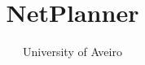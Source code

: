 \documentclass[12pt, a4paper]{article}
\begin{document}
\title{NetPlanner}
\author{University of Aveiro}
\maketitle

\tableofcontents
\clearpage
\newpage
\thispagestyle{empty}
\mbox{}
\pagebreak


\clearpage


\end{document}

